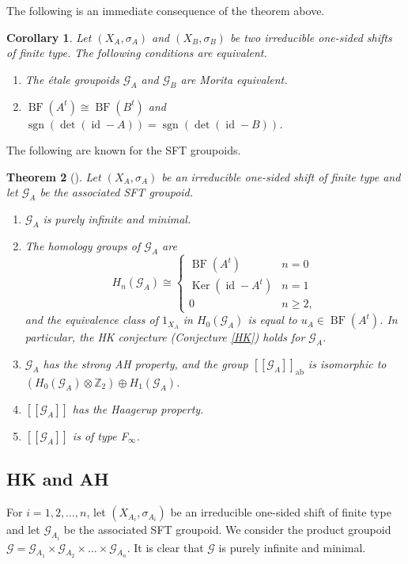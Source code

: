 \documentclass[11pt]{article}
\newtheorem{theorem}{Theorem}[section]
\newtheorem{corollary}[theorem]{Corollary}
\theoremstyle{definition}
\numberwithin{equation}{section}
\newcommand{\BF}{\operatorname{BF}}
\newcommand{\id}{\operatorname{id}}
\newcommand{\Ker}{\operatorname{Ker}}
\newcommand{\sgn}{\operatorname{sgn}}
\newcommand{\ab}{\mathrm{ab}}
\newcommand{\G}{\mathcal{G}}
\newcommand{\Z}{\mathbb{Z}}
\begin{document}
The following is an immediate consequence of the theorem above. 

\begin{corollary}\label{SFTMorita}
Let $(X_A,\sigma_A)$ and $(X_B,\sigma_B)$ be 
two irreducible one-sided shifts of finite type. 
The following conditions are equivalent. 
\begin{enumerate}
\item The \'etale groupoids $\G_A$ and $\G_B$ are Morita equivalent. 
\item $\BF(A^t)\cong\BF(B^t)$ and $\sgn(\det(\id-A))=\sgn(\det(\id-B))$. 
\end{enumerate}
\end{corollary}

The following are known for the SFT groupoids. 

\begin{theorem}[{\cite{M15crelle}}]\label{SFTproperty}
Let $(X_A,\sigma_A)$ be an irreducible one-sided shift of finite type 
and let $\G_A$ be the associated SFT groupoid. 
\begin{enumerate}
\item $\G_A$ is purely infinite and minimal. 
\item The homology groups of $\G_A$ are 
\[
H_n(\G_A)\cong\begin{cases}\BF(A^t)&n=0\\
\Ker(\id-A^t)&n=1\\
0&n\geq2, \end{cases}
\]
and the equivalence class of $1_{X_A}$ in $H_0(\G_A)$ 
is equal to $u_A\in\BF(A^t)$. 
In particular, the HK conjecture (Conjecture \ref{HK}) holds for $\G_A$. 
\item $\G_A$ has the strong AH property, and 
the group $[[\G_A]]_\ab$ is isomorphic to 
$(H_0(\G_A)\otimes\Z_2)\oplus H_1(\G_A)$. 
\item $[[\G_A]]$ has the Haagerup property. 
\item $[[\G_A]]$ is of type F$_\infty$. 
\end{enumerate}
\end{theorem}




\subsection{HK and AH}

For $i=1,2,\dots,n$, let $(X_{A_i},\sigma_{A_i})$ be 
an irreducible one-sided shift of finite type 
and let $\G_{A_i}$ be the associated SFT groupoid. 
We consider the product groupoid 
$\G=\G_{A_1}\times\G_{A_2}\times\dots\times\G_{A_n}$. 
It is clear that $\G$ is purely infinite and minimal. 
\end{document}
